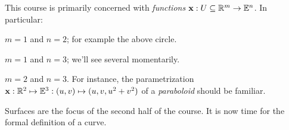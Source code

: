 
This course is primarily concerned with \emph{functions} ${\mathbf{x}}:U\subseteq\mathbb{R}^m\to\mathbb{E}^n$. In particular:
\begin{description}\itemsep0pt
	\item[\normalfont\emph{Plane curves}:] $m=1$ and $n=2$; for example the above circle.
	\item[\normalfont\emph{Spacecurves}:] $m=1$ and $n=3$; we'll see several momentarily.
	\item[\normalfont\emph{Surfaces}:] $m=2$ and $n=3$. For instance, the parametrization ${\mathbf{x}}:\mathbb{R}^2\mapsto\mathbb{E}^3:(u,v)\mapsto (u,v,u^2+v^2)$ of a \emph{paraboloid} should be  familiar.
\end{description}

Surfaces are the focus of the second half of the course. %
It is now time for the formal definition of a curve.

\goodbreak
 
% 
% 
% 
% 
% 
% 
% 
% 



